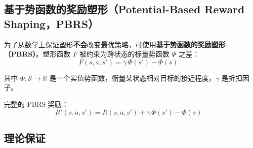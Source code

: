 \subsection{基于势函数的奖励塑形（Potential-Based Reward Shaping，PBRS）}
\label{potential-based-reward-shaping-pbrs}

为了从数学上保证塑形\textbf{不会}改变最优策略，可使用\textbf{基于势函数的奖励塑形（PBRS）}。塑形函数 $F$ 被约束为跨状态的标量势函数 $\Phi$ 之差：
\begin{equation}
\boxed{F(s, a, s') = \gamma\, \Phi(s') - \Phi(s)}
\end{equation}

其中 $\Phi: \mathcal{S} \to \mathbb{R}$ 是一个实值势函数，衡量某状态相对目标的接近程度，$\gamma$ 是折扣因子。

完整的 PBRS 奖励：
\begin{equation}
R'(s, a, s') = R(s, a, s') + \gamma\, \Phi(s') - \Phi(s)
\end{equation}

\subsection{理论保证}
\label{theoretical-guarantees}

